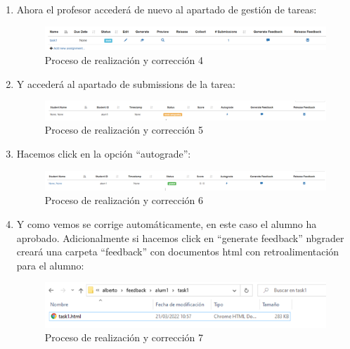 \begin{enumerate}
\item Ahora el profesor accederá de nuevo al apartado de gestión de tareas:

\begin{figure}[H]
    \centering
    \includegraphics[width=1\textwidth]{img/prueba/prueba_17.png}
    \caption{Proceso de realización y corrección 4}
\end{figure}

\item Y accederá al apartado de submissions de la tarea:

\begin{figure}[H]
    \centering
    \includegraphics[width=1\textwidth]{img/prueba/prueba_18.png}
    \caption{Proceso de realización y corrección 5}
\end{figure}

\item Hacemos click en la opción “autograde”:

\begin{figure}[H]
    \centering
    \includegraphics[width=1\textwidth]{img/prueba/prueba_19.png}
    \caption{Proceso de realización y corrección 6}
\end{figure}


\item Y como vemos se corrige automáticamente, en este caso el alumno ha aprobado. Adicionalmente si hacemos click en “generate feedback” nbgrader creará una carpeta “feedback” con documentos html con retroalimentación para el alumno:

\begin{figure}[H]
    \centering
    \includegraphics[width=1\textwidth]{img/prueba/prueba_20.png}
    \caption{Proceso de realización y corrección 7}
\end{figure}


\end{enumerate}
